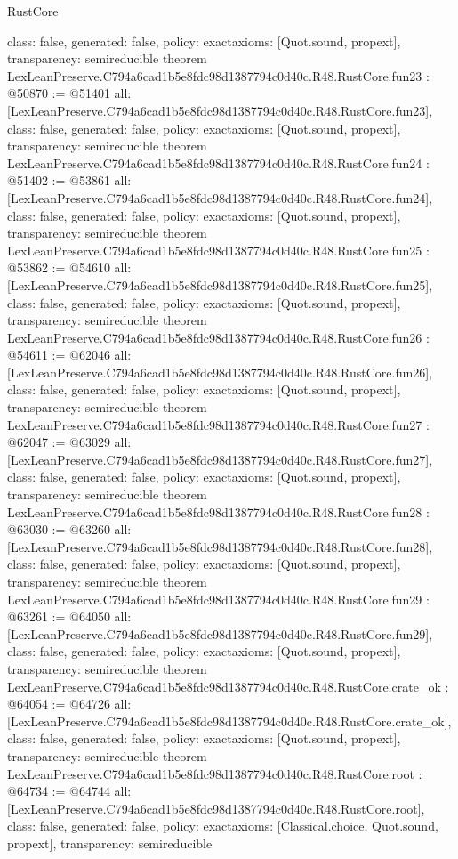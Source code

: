 \begin{lexlean}{RustCore}
\begin{coremodule}
{  class: false,
  generated: false,
  policy: exact{axioms: [Quot.sound, propext]},
  transparency: semireducible
}
theorem LexLeanPreserve.C794a6cad1b5e8fdc98d1387794c0d40c.R48.RustCore.fun23 : @50870 := @51401 {
  all: [LexLeanPreserve.C794a6cad1b5e8fdc98d1387794c0d40c.R48.RustCore.fun23],
  class: false,
  generated: false,
  policy: exact{axioms: [Quot.sound, propext]},
  transparency: semireducible
}
theorem LexLeanPreserve.C794a6cad1b5e8fdc98d1387794c0d40c.R48.RustCore.fun24 : @51402 := @53861 {
  all: [LexLeanPreserve.C794a6cad1b5e8fdc98d1387794c0d40c.R48.RustCore.fun24],
  class: false,
  generated: false,
  policy: exact{axioms: [Quot.sound, propext]},
  transparency: semireducible
}
theorem LexLeanPreserve.C794a6cad1b5e8fdc98d1387794c0d40c.R48.RustCore.fun25 : @53862 := @54610 {
  all: [LexLeanPreserve.C794a6cad1b5e8fdc98d1387794c0d40c.R48.RustCore.fun25],
  class: false,
  generated: false,
  policy: exact{axioms: [Quot.sound, propext]},
  transparency: semireducible
}
theorem LexLeanPreserve.C794a6cad1b5e8fdc98d1387794c0d40c.R48.RustCore.fun26 : @54611 := @62046 {
  all: [LexLeanPreserve.C794a6cad1b5e8fdc98d1387794c0d40c.R48.RustCore.fun26],
  class: false,
  generated: false,
  policy: exact{axioms: [Quot.sound, propext]},
  transparency: semireducible
}
theorem LexLeanPreserve.C794a6cad1b5e8fdc98d1387794c0d40c.R48.RustCore.fun27 : @62047 := @63029 {
  all: [LexLeanPreserve.C794a6cad1b5e8fdc98d1387794c0d40c.R48.RustCore.fun27],
  class: false,
  generated: false,
  policy: exact{axioms: [Quot.sound, propext]},
  transparency: semireducible
}
theorem LexLeanPreserve.C794a6cad1b5e8fdc98d1387794c0d40c.R48.RustCore.fun28 : @63030 := @63260 {
  all: [LexLeanPreserve.C794a6cad1b5e8fdc98d1387794c0d40c.R48.RustCore.fun28],
  class: false,
  generated: false,
  policy: exact{axioms: [Quot.sound, propext]},
  transparency: semireducible
}
theorem LexLeanPreserve.C794a6cad1b5e8fdc98d1387794c0d40c.R48.RustCore.fun29 : @63261 := @64050 {
  all: [LexLeanPreserve.C794a6cad1b5e8fdc98d1387794c0d40c.R48.RustCore.fun29],
  class: false,
  generated: false,
  policy: exact{axioms: [Quot.sound, propext]},
  transparency: semireducible
}
theorem LexLeanPreserve.C794a6cad1b5e8fdc98d1387794c0d40c.R48.RustCore.crate_ok : @64054 := @64726 {
  all: [LexLeanPreserve.C794a6cad1b5e8fdc98d1387794c0d40c.R48.RustCore.crate_ok],
  class: false,
  generated: false,
  policy: exact{axioms: [Quot.sound, propext]},
  transparency: semireducible
}
theorem LexLeanPreserve.C794a6cad1b5e8fdc98d1387794c0d40c.R48.RustCore.root : @64734 := @64744 {
  all: [LexLeanPreserve.C794a6cad1b5e8fdc98d1387794c0d40c.R48.RustCore.root],
  class: false,
  generated: false,
  policy: exact{axioms: [Classical.choice, Quot.sound, propext]},
  transparency: semireducible
}


\end{coremodule}
\end{lexlean}
